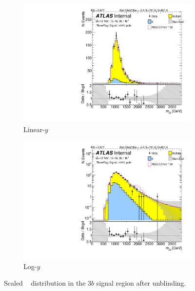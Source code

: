 \begin{figure}[htb!]
\begin{center}
    \captionsetup{justification=centering}
    \begin{subfigure}[b]{0.45\textwidth}
        \includegraphics[width=\textwidth,angle=-90]{figures/boosted/Signal_Syst/Moriond_bkg_9_ThreeTag_Signal_mHH_pole.pdf}
        \caption{Linear-$y$}
        \label{fig:boosted-3b-signal-pole-lin}
    \end{subfigure}
    \quad
    \begin{subfigure}[b]{0.45\textwidth}
        \includegraphics[width=\textwidth,angle=-90]{figures/boosted/Signal_Syst/Moriond_bkg_9_ThreeTag_Signal_mHH_pole_1.pdf}
        \caption{Log-$y$}
        \label{fig:boosted-3b-signal-pole-log}
    \end{subfigure}
  \caption{Scaled \mtwoJ~ distribution in the $3b$ signal region after unblinding.}
  \label{fig:boosted-3b-signal-pole}
\end{center}
\end{figure}

